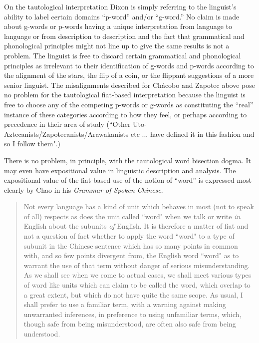 \documentclass[output=paper,hidelinks]{langscibook}
\begin{document}
On the tautological interpretation Dixon is simply referring to the linguist's ability to label certain domains ``p-word'' and/or ``g-word.'' No claim is made about g-words or p-words having a unique interpretation from language to language or from description to description and the fact that grammatical and phonological principles might not line up to give the same results is not a problem. The linguist is free to discard certain grammatical and phonological principles as irrelevant to their identification of g-words and p-words according to the alignment of the stars, the flip of a coin, or the flippant suggestions of a more senior linguist. The misalignments described for Chácobo and Zapotec above pose no problem for the tautological fiat-based interpretation because the linguist is free to choose any of the competing p-words or g-words as constituting the ``real'' instance of these categories according to how they feel, or perhaps according to precedence in their area of study (``Other Uto-Aztecanists/Zapotecanists/Arawakanists etc ... have defined it in this fashion and so I follow them".)

There is no problem, in principle, with the tautological word bisection dogma. It may even have expositional value in linguistic description and analysis. The expositional value of the fiat-based use of the notion of ``word'' is expressed most clearly by Chao in his \textit{Grammar of Spoken Chinese}.

\begin{quote}
    Not every language has a kind of unit which behaves in most (not to speak of all) respects as does the unit called ``word" when we talk or write \textit{in} English about the subunits \textit{of} English. It is therefore a matter of fiat and not a question of fact whether to apply the word ``word" to a type of subunit in the Chinese sentence which has so many points in common with, and so few points divergent from, the English word ``word" as to warrant the use of that term without danger of serious misunderstanding. As we shall see when we come to actual cases, we shall meet various types of word like units which can claim to be called the word, which overlap to a great extent, but which do not have quite the same scope. As usual, I shall prefer to use a familiar term, with a warning against making unwarranted inferences, in preference to using unfamiliar terms, which, though safe from being misunderstood, are often also safe from being understood. \citep[159]{chao2011grammar}
\end{quote}
\end{document}

